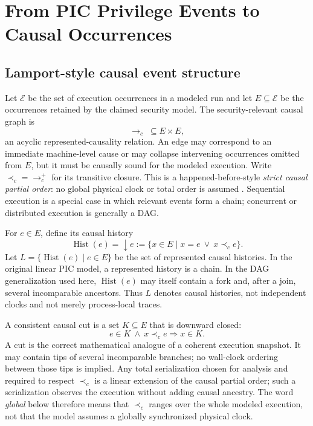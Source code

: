 \documentclass[10pt,twocolumn]{article}
\newcommand{\hb}{\prec_{c}}
\newcommand{\Hist}{\operatorname{Hist}}
\begin{document}
\section{From PIC Privilege Events to Causal Occurrences}
\label{sec:causal-pic}

\subsection{Lamport-style causal event structure}

Let $\mathcal E$ be the set of execution occurrences in a modeled run and let
$E\subseteq\mathcal E$ be the occurrences retained by the claimed security
model.  The security-relevant causal graph is
\begin{equation}
  \to_c\;\subseteq E\times E,
\end{equation}
an acyclic represented-causality relation.  An edge may correspond to an
immediate machine-level cause or may collapse intervening occurrences omitted
from $E$, but it must be causally sound for the modeled execution.  Write
$\hb=\to_c^{+}$ for its transitive closure.  This is a happened-before-style
\emph{strict causal partial order}: no global physical clock or total order is
assumed \cite{lamport1978}.  Sequential execution is a special case in which
relevant events form a chain; concurrent or distributed execution is generally
a DAG.

For $e\in E$, define its causal history
\begin{equation}
  \Hist(e)=\downarrow e
  :=\{x\in E\mid x=e\ \lor\ x\hb e\}.
  \label{eq:hist-downset}
\end{equation}
Let $L=\{\Hist(e)\mid e\in E\}$ be the set of represented causal histories.
In the original linear PIC model, a represented history is a chain.  In the
DAG generalization used here, $\Hist(e)$ may itself contain a fork and, after a
join, several incomparable ancestors.  Thus $L$ denotes causal histories, not
independent clocks and not merely process-local traces.

A consistent causal cut is a set $K\subseteq E$ that is downward closed:
\begin{equation}
  e\in K\ \land\ x\hb e\Longrightarrow x\in K.
  \label{eq:consistent-cut}
\end{equation}
A cut is the correct mathematical analogue of a coherent execution snapshot.
It may contain tips of several incomparable branches; no wall-clock ordering
between those tips is implied.  Any total serialization chosen for analysis
and required to respect $\hb$ is a linear extension of the causal partial order;
such a serialization observes the execution without adding causal ancestry.
The word \emph{global} below therefore means that $\hb$ ranges over the whole
modeled execution, not that the model assumes a globally synchronized physical
clock.
\end{document}
